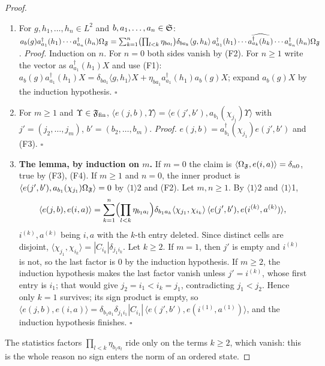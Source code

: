\begin{proof}
\begin{enumerate}
\item[$\langle1\rangle$1.] For $g,h_1,\dots,h_n\in L^2$ and $b,a_1,\dots,a_n\in\mathfrak S$:
$a_b(g)a^\dagger_{a_1}(h_1)\cdots a^\dagger_{a_n}(h_n)\Omega_{\mathfrak F}=\sum_{k=1}^n\bigl(\prod_{l<k}\eta_{ba_l}\bigr)
\delta_{ba_k}\langle g,h_k\rangle\,a^\dagger_{a_1}(h_1)\cdots\widehat{a^\dagger_{a_k}(h_k)}\cdots
a^\dagger_{a_n}(h_n)\Omega_{\mathfrak F}$. \emph{Proof.} Induction on $n$. For $n=0$ both sides vanish by (F2).
For $n\ge1$ write the vector as $a^\dagger_{a_1}(h_1)X$ and use (F1):
$a_b(g)a^\dagger_{a_1}(h_1)X=\delta_{ba_1}\langle g,h_1\rangle X+\eta_{ba_1}a^\dagger_{a_1}(h_1)a_b(g)X$;
expand $a_b(g)X$ by the induction hypothesis. $\square$
\item[$\langle1\rangle$2.] For $m\ge1$ and $\Upsilon\in\mathfrak F_{\mathrm{fin}}$,
$\langle e(j,b),\Upsilon\rangle=\langle e(j',b'),a_{b_1}(\chi_{j_1})\Upsilon\rangle$ with
$j'=(j_2,\dots,j_m)$, $b'=(b_2,\dots,b_m)$. \emph{Proof.}
$e(j,b)=a^\dagger_{b_1}(\chi_{j_1})e(j',b')$ and (F3). $\square$
\item[$\langle1\rangle$3.] \textbf{The lemma, by induction on $m$.} If $m=0$ the claim is
$\langle\Omega_{\mathfrak F},e(i,a)\rangle=\delta_{n0}$, true by (F3), (F4). If $m\ge1$ and $n=0$, the inner
product is $\langle e(j',b'),a_{b_1}(\chi_{j_1})\Omega_{\mathfrak F}\rangle=0$ by $\langle1\rangle$2 and (F2).
Let $m,n\ge1$. By $\langle1\rangle$2 and $\langle1\rangle$1,
\[
\langle e(j,b),e(i,a)\rangle=\sum_{k=1}^n\Bigl(\prod_{l<k}\eta_{b_1a_l}\Bigr)\delta_{b_1a_k}
\langle\chi_{j_1},\chi_{i_k}\rangle\,\langle e(j',b'),e(i^{(k)},a^{(k)})\rangle ,
\]
$i^{(k)},a^{(k)}$ being $i,a$ with the $k$-th entry deleted. Since distinct cells are disjoint,
$\langle\chi_{j_1},\chi_{i_k}\rangle=|C_{i_k}|\delta_{j_1i_k}$. Let $k\ge2$. If $m=1$, then
$j'$ is empty and $i^{(k)}$ is not, so the last factor is $0$ by the induction hypothesis. If
$m\ge2$, the induction hypothesis makes the last factor vanish unless $j'=i^{(k)}$, whose
first entry is $i_1$; that would give $j_2=i_1<i_k=j_1$, contradicting $j_1<j_2$. Hence only
$k=1$ survives; its sign product is empty, so
$\langle e(j,b),e(i,a)\rangle=\delta_{b_1a_1}\delta_{j_1i_1}|C_{i_1}|\,\langle
e(j',b'),e(i^{(1)},a^{(1)})\rangle$, and the induction hypothesis finishes. $\square$
\end{enumerate}
The statistics factors $\prod_{l<k}\eta_{b_1a_l}$ ride only on the terms $k\ge2$, which vanish:
this is the whole reason no sign enters the norm of an ordered state.
\end{proof}

